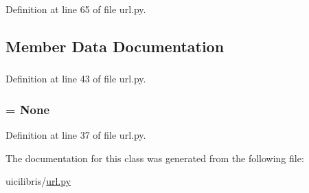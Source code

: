 \-Definition at line 65 of file url.\-py.



\subsection{\-Member \-Data \-Documentation}
\hypertarget{classuicilibris_1_1url_1_1Cache_ac7e0c129e67571f01ce9cb519d6f9393}{
\subsubsection[{dict}]{}}\label{classuicilibris_1_1url_1_1Cache_ac7e0c129e67571f01ce9cb519d6f9393}


\-Definition at line 43 of file url.\-py.

\hypertarget{classuicilibris_1_1url_1_1Cache_ab1394c9f1b1806cac5148ac421431ad5}{
\subsubsection[{the\-Cache}]{ = \-None}}\label{classuicilibris_1_1url_1_1Cache_ab1394c9f1b1806cac5148ac421431ad5}


\-Definition at line 37 of file url.\-py.



\-The documentation for this class was generated from the following file\-:\begin{DoxyCompactItemize}
\item 
uicilibris/\hyperlink{url_8py}{url.\-py}\end{DoxyCompactItemize}
